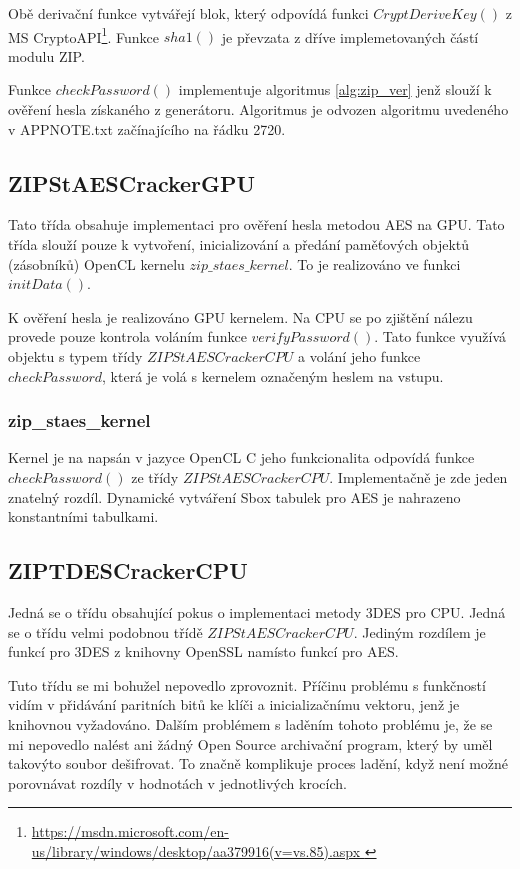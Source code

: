 Obě derivační funkce vytvářejí blok, který odpovídá funkci $CryptDeriveKey()$ z MS
CryptoAPI\footnote{\url{https://msdn.microsoft.com/en-us/library/windows/desktop/aa379916(v=vs.85).aspx
}}. Funkce $sha1()$ je převzata z dříve implemetovaných částí modulu ZIP.

 Funkce $checkPassword()$ implementuje algoritmus \ref{alg:zip_ver} jenž slouží k ověření hesla
získaného z generátoru. Algoritmus je odvozen algoritmu uvedeného v APPNOTE.txt začínajícího na
řádku 2720.

\subsection{ZIPStAESCrackerGPU}
Tato třída obsahuje implementaci pro ověření hesla metodou AES na GPU. Tato třída slouží pouze k
vytvoření, inicializování a předání paměťových objektů (zásobníků) OpenCL kernelu
$zip\_staes\_kernel$. To je realizováno ve funkci $initData()$. 

 K ověření hesla je realizováno GPU kernelem. Na CPU se po zjištění nálezu provede pouze
kontrola voláním funkce $verifyPassword()$. Tato funkce využívá objektu s typem třídy
$ZIPStAESCrackerCPU$ a volání jeho funkce $checkPassword$, která je volá s kernelem označeným
heslem na vstupu.

\subsubsection{zip\_staes\_kernel}
Kernel je na napsán v jazyce OpenCL C jeho funkcionalita odpovídá funkce $checkPassword()$ ze
třídy $ZIPStAESCrackerCPU$. Implementačně je zde jeden znatelný rozdíl. Dynamické vytváření Sbox
tabulek pro AES je nahrazeno konstantními tabulkami.
 
\subsection{ZIPTDESCrackerCPU}
Jedná se o třídu obsahující pokus o implementaci metody 3DES pro CPU. Jedná se o třídu velmi
podobnou třídě $ZIPStAESCrackerCPU$. Jediným rozdílem je funkcí pro 3DES z knihovny OpenSSL
namísto funkcí pro AES.

 Tuto třídu se mi bohužel nepovedlo zprovoznit. Příčinu problému s funkčností vidím v přidávání
paritních bitů ke klíči a inicializačnímu vektoru, jenž je knihovnou vyžadováno. Dalším
problémem s laděním tohoto problému je, že se mi nepovedlo nalést ani žádný Open Source
archivační program, který by uměl takovýto soubor dešifrovat. To značně komplikuje proces ladění,
když není možné porovnávat rozdíly v hodnotách v jednotlivých krocích.

